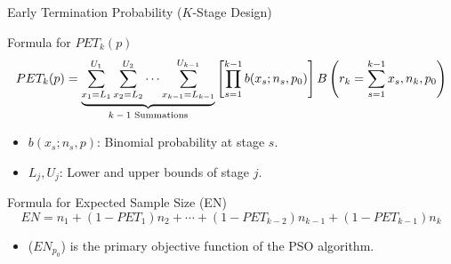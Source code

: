 \documentclass[xcolor=red]{beamer}
\begin{document}
\begin{frame}{Early Termination Probability (\( K \)-Stage Design)}
\begin{block}{Formula for \( PET_k(p) \)}
\footnotesize
\[
PET_k(p) = 
\underbrace{
\sum_{x_1 = L_1}^{U_1} \sum_{x_2 = L_2}^{U_2} \cdots \sum_{x_{k-1} = L_{k-1}}^{U_{k-1}}
}_{\text{\( k-1 \) Summations}}
\left[ \prod_{s=1}^{k-1} b(x_s; n_s, p_0) \right]
B\left( r_k = \sum_{s=1}^{k-1} x_s, n_k, p_0 \right)
\]
\end{block}

\scriptsize
\begin{itemize}
    \item \( b(x_s; n_s, p) \): Binomial probability at stage \( s \).
    \item \( L_j, U_j \): Lower and upper bounds of stage \( j \).
\end{itemize}

\begin{block}{Formula for Expected Sample Size (EN)}
\footnotesize
\[
EN = n_1 + (1 - PET_1) n_2 + \cdots + (1 - PET_{k-2}) n_{k-1} + (1 - PET_{k-1}) n_k
\]
\end{block}
\footnotesize
\begin{itemize}
\item (\( EN_{p_0} \)) is the primary  objective function of the PSO algorithm.
\end{itemize}
\end{frame}
\end{document}

